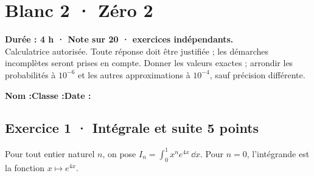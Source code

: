 \fi

\mxnewpage{}\label{sujet:8-2}

\section*{Blanc 2 · Zéro 2}


\textbf{Durée : 4 h · Note sur 20 ·  exercices indépendants.}\\Calculatrice autorisée. Toute réponse doit être justifiée ; les démarches incomplètes seront prises en compte. Donner les valeurs exactes ; arrondir les probabilités à $10^{-6}$ et les autres approximations à $10^{-4}$, sauf précision différente.

\smallskip\textbf{Nom :}\enspace\dotfill\quad\textbf{Classe :}\enspace\dotfill\quad\textbf{Date :}\enspace\dotfill

\subsection*{Exercice 1 · Intégrale et suite \hfill 5 points}Pour tout entier naturel $n$, on pose $I_n=\displaystyle\int_0^1x^ne^{4x}\,\dd x$. Pour $n=0$, l'intégrande est la fonction $x\mapsto e^{4x}$.

